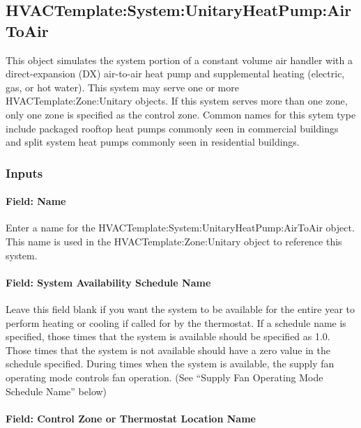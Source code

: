 \subsection{HVACTemplate:System:UnitaryHeatPump:AirToAir}\label{hvactemplatesystemunitaryheatpumpairtoair}

This object simulates the system portion of a constant volume air handler with a direct-expansion (DX) air-to-air heat pump and supplemental heating (electric, gas, or hot water). This system may serve one or more HVACTemplate:Zone:Unitary objects. If this system serves more than one zone, only one zone is specified as the control zone. Common names for this sytem type include packaged rooftop heat pumps commonly seen in commercial buildings and split system heat pumps commonly seen in residential buildings.

\subsubsection{Inputs}\label{inputs-16-004}

\paragraph{Field: Name}\label{field-name-3-016}

Enter a name for the HVACTemplate:System:UnitaryHeatPump:AirToAir object. This name is used in the HVACTemplate:Zone:Unitary object to reference this system.

\paragraph{Field: System Availability Schedule Name}\label{field-system-availability-schedule-name-8}

Leave this field blank if you want the system to be available for the entire year to perform heating or cooling if called for by the thermostat. If a schedule name is specified, those times that the system is available should be specified as 1.0. Those times that the system is not available should have a zero value in the schedule specified. During times when the system is available, the supply fan operating mode controls fan operation. (See ``Supply Fan Operating Mode Schedule Name'' below)

\paragraph{Field: Control Zone or Thermostat Location Name}\label{field-control-zone-or-thermostat-location-name-1}

